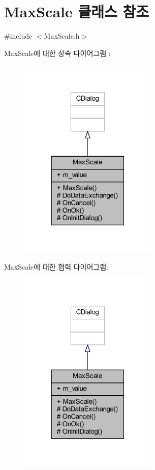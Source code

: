 \hypertarget{class_max_scale}{}\section{Max\+Scale 클래스 참조}
\label{class_max_scale}


{\ttfamily \#include $<$Max\+Scale.\+h$>$}



Max\+Scale에 대한 상속 다이어그램 \+: \nopagebreak
\begin{figure}[H]
\begin{center}
\leavevmode
\includegraphics[width=187pt]{class_max_scale__inherit__graph}
\end{center}
\end{figure}


Max\+Scale에 대한 협력 다이어그램\+:\nopagebreak
\begin{figure}[H]
\begin{center}
\leavevmode
\includegraphics[width=187pt]{class_max_scale__coll__graph}
\end{center}
\end{figure}
